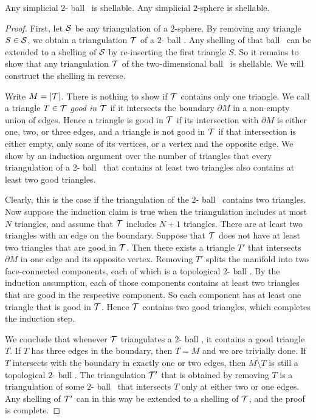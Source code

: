 \documentclass[10pt,letterpaper]{article}
\newcommand\cye[1]{%
\protect\leavevmode
\begingroup
    \color{red!35!yellow}%
    #1%
\endgroup
}
\newcommand{\disk}{\cye{ball}}
\begin{document}
\begin{lemma}\label{lemma:shell_2D}
    Any simplicial $2$-\disk\ is shellable.
    Any simplicial $2$-sphere is shellable. 
\end{lemma}
\begin{proof}
    First, 
    let ${\mathcal S}$ be any triangulation of a $2$-sphere. 
    By removing any triangle $S \in {\mathcal S}$, we obtain a triangulation ${\mathcal T}$ of a $2$-\disk.
    Any shelling of that \disk\ can be extended to a shelling of ${\mathcal S}$ by re-inserting the first triangle $S$.
    So it remains to show that any triangulation ${\mathcal T}$ of the two-dimensional \disk\ is shellable. 
    We will construct the shelling in reverse. 
    
    Write $M = |{\mathcal T}|$. 
    There is nothing to show if ${\mathcal T}$ contains only one triangle. 
    We call a triangle $T \in {\mathcal T}$ \emph{good in ${\mathcal T}$} if it intersects the boundary $\partial M$ in a non-empty union of edges. 
    Hence a triangle is good in ${\mathcal T}$ if its intersection with $\partial M$ is either one, two, or three edges,
    and a triangle is not good in ${\mathcal T}$ if that intersection is either empty, only some of its vertices, or a vertex and the opposite edge.
    We show by an induction argument over the number of triangles that every triangulation of a $2$-\disk\ that contains at least two triangles also contains at least two good triangles. 

    Clearly, this is the case if the triangulation of the $2$-\disk\ contains two triangles. 
    Now suppose the induction claim is true when the triangulation includes at most $N$ triangles,
    and assume that ${\mathcal T}$ includes $N+1$ triangles. 
    There are at least two triangles with an edge on the boundary. 
    Suppose that ${\mathcal T}$ does not have at least two triangles that are good in ${\mathcal T}$.
    Then there exists a triangle $T'$ that intersects $\partial M$ 
    in one edge and its opposite vertex.
    Removing $T'$ splits the manifold into two face-connected components, each of which is a topological $2$-\disk.
    By the induction assumption, each of those components contains at least two triangles 
    that are good in the respective component. 
    So each component has at least one triangle that is good in ${\mathcal T}$. 
    Hence ${\mathcal T}$ contains two good triangles, which completes the induction step. 
    
    We conclude that whenever ${\mathcal T}$ triangulates a $2$-\disk,
    it contains a good triangle $T$. 
    If $T$ has three edges in the boundary, then $T = M$ and we are trivially done. 
    If $T$ intersects with the boundary in exactly one or two edges, 
    then $\overline{M \setminus T}$ is still a topological $2$-\disk.
    The triangulation ${\mathcal T}'$ that is obtained by removing $T$
    is a triangulation of some $2$-\disk\ that intersects $T$ only at either two or one edges.
    Any shelling of ${\mathcal T}'$ can in this way be extended to a shelling of ${\mathcal T}$, and the proof is complete. 
\end{proof}
\end{document}
